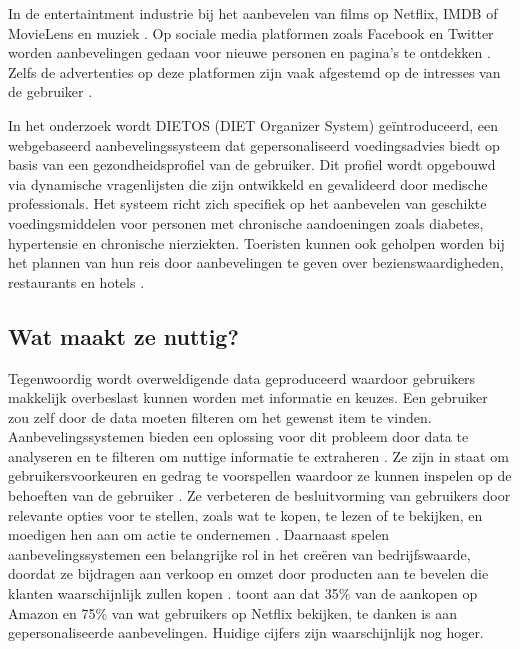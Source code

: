 In de entertaintment industrie bij het aanbevelen van films op Netflix, IMDB of MovieLens en muziek \autocite{Patel2020, Roy2022}. Op sociale media platformen zoals Facebook en Twitter worden aanbevelingen gedaan voor nieuwe personen en pagina's te ontdekken \autocite{Patel2023}. Zelfs de advertenties op deze platformen zijn vaak afgestemd op de intresses van de gebruiker \autocite{Patel2020}.

In het onderzoek \textcite{Agapito2016} wordt DIETOS (DIET Organizer System) geïntroduceerd, een webgebaseerd aanbevelingssysteem dat gepersonaliseerd voedingsadvies biedt op basis van een gezondheidsprofiel van de gebruiker. Dit profiel wordt opgebouwd via dynamische vragenlijsten die zijn ontwikkeld en gevalideerd door medische professionals. Het systeem richt zich specifiek op het aanbevelen van geschikte voedingsmiddelen voor personen met chronische aandoeningen zoals diabetes, hypertensie en chronische nierziekten. Toeristen kunnen ook geholpen worden bij het plannen van hun reis door aanbevelingen te geven over bezienswaardigheden, restaurants en hotels \autocite{Roy2022, Patel2023}.
\subsection{Wat maakt ze nuttig?}
Tegenwoordig wordt overweldigende data geproduceerd waardoor gebruikers makkelijk overbeslast kunnen worden met informatie en keuzes. Een gebruiker zou zelf door de data moeten filteren om het gewenst item te vinden. Aanbevelingssystemen bieden een oplossing voor dit probleem door data te analyseren en te filteren om nuttige informatie te extraheren \autocite{Fkih2022}. Ze zijn in staat om gebruikersvoorkeuren en gedrag te voorspellen waardoor ze kunnen inspelen op de behoeften van de gebruiker \autocite{Mazeh2020}. Ze verbeteren de besluitvorming van gebruikers door relevante opties voor te stellen, zoals wat te kopen, te lezen of te bekijken, en moedigen hen aan om actie te ondernemen \autocite{Mazeh2020}. Daarnaast spelen aanbevelingssystemen een belangrijke rol in het creëren van bedrijfswaarde, doordat ze bijdragen aan verkoop en omzet door producten aan te bevelen die klanten waarschijnlijk zullen kopen \autocite{Wang2018, Patel2023}. \autocite{MacKenzie2013} toont aan dat 35\% van de aankopen op Amazon en 75\% van wat gebruikers op Netflix bekijken, te danken is aan gepersonaliseerde aanbevelingen. Huidige cijfers zijn waarschijnlijk nog hoger.
